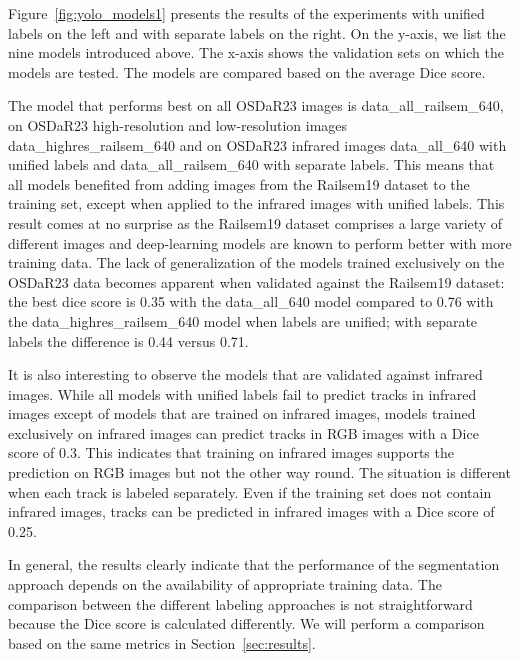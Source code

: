 \documentclass[Master,MDS,english]{BASE/twbook} %
\begin{document}
Figure~\ref{fig:yolo_models1} presents the results of the experiments with unified labels on the left and with separate labels on the right. On the y-axis, we list the nine models introduced above. The x-axis shows the validation sets on which the models are tested. The models are compared based on the average Dice score.

 The model that performs best on all OSDaR23 images is data\_all\_railsem\_640, on OSDaR23 high-resolution and low-resolution images data\_highres\_railsem\_640 and on OSDaR23 infrared images data\_all\_640 with unified labels and  data\_all\_railsem\_640 with separate labels. This means that all models benefited from adding images from the Railsem19 dataset to the training set, except when applied to the infrared images with unified labels. This result comes at no surprise as the Railsem19 dataset comprises a large variety of different images and deep-learning models are known to perform better with more training data. 
 The lack of generalization of the models trained exclusively on the OSDaR23 data becomes apparent when validated against the Railsem19 dataset: the best dice score is 0.35 with the data\_all\_640 model compared to 0.76 with the data\_highres\_railsem\_640 model when labels are unified; with separate labels the difference is 0.44 versus 0.71.

 It is also interesting to observe the models that are validated against infrared images. While all models with unified labels fail to predict tracks in infrared images except of models that are trained on infrared images, models trained exclusively on infrared images can predict tracks in RGB images with a Dice score of 0.3. This indicates that training on infrared images supports the prediction on RGB images but not the other way round. The situation is different when each track is labeled separately. Even if the training set does not contain infrared images, tracks can be predicted in infrared images with a Dice score of 0.25.

In general, the results clearly indicate that the performance of the segmentation approach depends on the availability of appropriate training data. The comparison between the different labeling approaches is not straightforward because the Dice score is calculated differently. We will perform a comparison based on the same metrics in Section~\ref{sec:results}.


 
\end{document}
